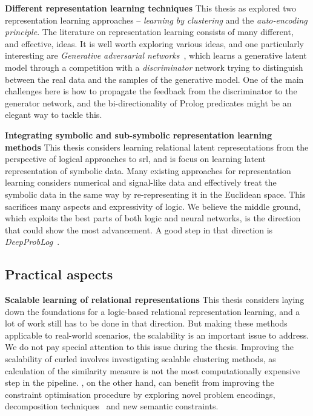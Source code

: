 \textbf{Different representation learning techniques}
This thesis as explored two representation learning approaches -- \textit{learning by clustering} and the \textit{auto-encoding principle}.
The literature on representation learning consists of many different, and effective, ideas.
It is well worth exploring various ideas, and one particularly interesting are \textit{Generative adversarial networks}~\cite{Goodfellow:2014:GAN:2969033.2969125}, which learns a generative latent model through a competition with a \textit{discriminator} network trying to distinguish between the real data and the samples of the generative model.
One of the main challenges here is how to propagate the feedback from the discriminator to the generator network, and the bi-directionality of Prolog predicates might be an elegant way to tackle this.



\textbf{Integrating symbolic and sub-symbolic representation learning methods}
This thesis considers learning relational latent representations from the perspective of logical approaches to \gls{srl}, and is focus on learning latent representation of symbolic data.
Many existing approaches for representation learning considers numerical and signal-like data and effectively treat the symbolic data in the same way by re-representing it in the Euclidean space.
This sacrifices many aspects and expressivity of logic.
We believe the middle ground, which exploits the best parts of both logic and neural networks, is the direction that could show the most advancement.
A good step in that direction is \textit{DeepProbLog}~\cite{DBLP:journals/corr/abs-1805-10872}.



\subsection{Practical aspects}


\textbf{Scalable learning of relational representations}
This thesis considers laying down the foundations for a logic-based relational representation learning, and a lot of work still has to be done in that direction.
But making these methods applicable to real-world scenarios, the scalability is an important issue to address.
We do not pay special attention to this issue during the thesis.
Improving the scalability of \gls{curled} involves investigating scalable clustering methods, as calculation of the similarity measure is not the most computationally expensive step in the pipeline.
, on the other hand, can benefit from improving the constraint optimisation procedure by exploring novel problem encodings, decomposition techniques~\cite{decompositions,Friesen:2015:RDN:2832249.2832284}  and new semantic constraints.



